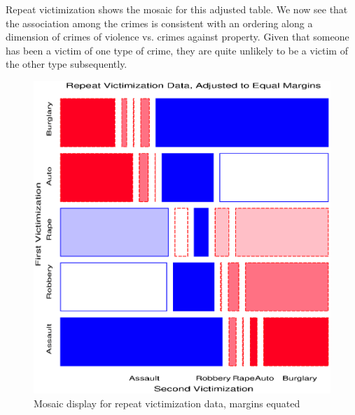 \begin{Example}[victims]{Repeat victimization}
 shows the mosaic for this adjusted table.
We now see that the association among the crimes is consistent
with an ordering along a dimension of crimes of violence vs. crimes
against property.  Given that someone has been a victim of one type
of crime, they are quite unlikely to be a victim of the other type
subsequently.
\begin{figure}[htb]
  \centering
  \includegraphics[scale=.6]{ch4/fig/victims2}
  \caption{Mosaic display for repeat victimization data, margins equated}%
  \label{fig:victims2}
\end{figure}


\end{Example}
